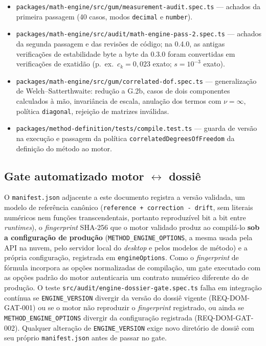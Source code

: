 \documentclass[11pt,a4paper]{article}
\newcommand{\docVersion}{0.4.0}
\newcommand{\previousVersion}{0.3.0}
\begin{document}
\begin{itemize}
  \item \texttt{packages/math-engine/src/gum/measurement-audit.spec.ts} --- achados da primeira passagem (40 casos, modos \texttt{decimal} e \texttt{number}).
  \item \texttt{packages/math-engine/src/audit/math-engine-pass-2.spec.ts} --- achados da segunda passagem e das revisões de código; na \docVersion{}, as antigas verificações de estabilidade byte a byte da \previousVersion{} foram convertidas em verificações de exatidão (p.~ex.\ \(c_k = 0{,}023\) exato; \(s = 10^{-3}\) exato).
  \item \texttt{packages/math-engine/src/gum/correlated-dof.spec.ts} --- generalização de Welch--Satterthwaite: redução a G.2b, casos de dois componentes calculados à mão, invariância de escala, anulação dos termos com \(\nu = \infty\), política \texttt{diagonal}, rejeição de matrizes inválidas.
  \item \texttt{packages/method-definition/tests/compile.test.ts} --- guarda de versão na execução e passagem da política \texttt{correlatedDegreesOfFreedom} da definição do método ao motor.
\end{itemize}

\subsection{Gate automatizado motor \(\leftrightarrow\) dossiê}

O \texttt{manifest.json} adjacente a este documento registra a versão validada, um modelo de referência canônico (\texttt{reference + correction - drift}, sem literais numéricos nem funções transcendentais, portanto reproduzível bit a bit entre \emph{runtimes}), o \emph{fingerprint} SHA-256 que o motor validado produz ao compilá-lo \textbf{sob a configuração de produção} (\texttt{METHOD\_ENGINE\_OPTIONS}, a mesma usada pela API na nuvem, pelo servidor local do \emph{desktop} e pelos modelos de método) e a própria configuração, registrada em \texttt{engineOptions}. Como o \emph{fingerprint} de fórmula incorpora as opções normalizadas de compilação, um gate executado com as opções padrão do motor autenticaria um contrato numérico diferente do de produção. O teste \texttt{src/audit/engine-dossier-gate.spec.ts} falha em integração contínua se \texttt{ENGINE\_VERSION} divergir da versão do dossiê vigente (REQ-DOM-GAT-001) ou se o motor não reproduzir o \emph{fingerprint} registrado, ou ainda se \texttt{METHOD\_ENGINE\_OPTIONS} divergir da configuração registrada (REQ-DOM-GAT-002). Qualquer alteração de \texttt{ENGINE\_VERSION} exige novo diretório de dossiê com seu próprio \texttt{manifest.json} antes de passar no gate.
\end{document}
